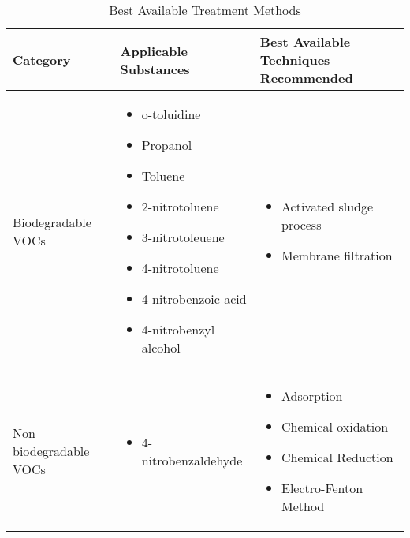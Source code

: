 \begin{table}[H]
\centering
\caption{Best Available Treatment Methods}
\label{tab:treat}
\begin{tabularx}{\linewidth}{lp{45mm}X}
\toprule
\textbf{Category}      & \textbf{Applicable Substances}                                                                                                                           												 	& \textbf{Best Available Techniques \cite{european_commission_joint_research_centre_best_2018} Recommended}         				\\ \midrule
Biodegradable VOCs     & \begin{itemize} \item o-toluidine \item Propanol \item Toluene \item 2-nitrotoluene  \item  3-nitrotoleuene \item  4-nitrotoluene  \item  4-nitrobenzoic acid \item 4-nitrobenzyl alcohol \end{itemize} 	& \begin{itemize} \item Activated sludge process \item Membrane filtration \end{itemize}                               			\\ \cmidrule{1-3}
Non-biodegradable VOCs & \begin{itemize} \item 4-nitrobenzaldehyde \end{itemize}                                                                                                                                                 	& \begin{itemize} \item Adsorption \item  Chemical oxidation  \item Chemical Reduction \item Electro-Fenton Method \end{itemize} 	\\ \bottomrule
\end{tabularx}
\end{table}


